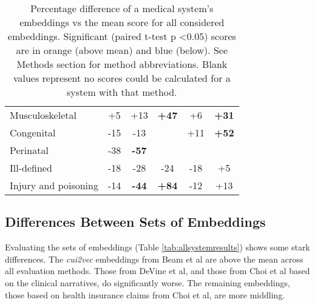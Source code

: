 \documentclass[11pt,a4paper]{article}
\def\blu#1{{\textbf{\color{blu}#1}}}
\def\ora#1{{\textbf{\color{ora}#1}}}
\begin{document}
\begin{table*}[h]
\begin{center}
\begin{tabular}{l|c|c|c|c|c}
		Musculoskeletal        & +5                         & +13                          & \ora{+47}  & +6                        & \ora{+31} \\
		Congenital           & -15                         & -13                        &                               & +11                        & \ora{+52} \\
		Perinatal            & -38                        & \blu{-57} &                               &                              &                              \\
		Ill-defined          & -18                        & -28                        & -24                        & -18                       & +5                        \\
		Injury and poisoning & -14                        & \blu{-44} & \ora{+84}  & -12                       & +13                       
	\end{tabular}
	\caption{Percentage difference of a medical system's embeddings vs the mean score for all considered embeddings. Significant (paired t-test p \textless 0.05) scores are in orange (above mean) and blue (below). See Methods section for method abbreviations. Blank values represent no scores could be calculated for a system with that method.}
\end{center}
\end{table*}

\subsection{Differences Between Sets of Embeddings}
 Evaluating the sets of embeddings (Table \ref{tab:allsystemresults}) shows some stark differences. The \emph{cui2vec} embeddings from Beam et al are above the mean across all evaluation methods. Those from DeVine et al, and those from Choi et al based on the clinical narratives, do significantly worse. The remaining embeddings, those based on health insurance claims from Choi et al, are more middling. 
\end{document}
